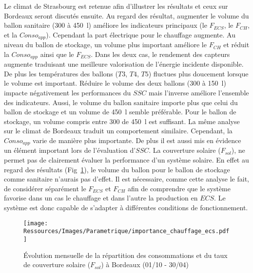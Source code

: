 Le climat de Strasbourg est retenue afin d’illustrer les résultats et ceux sur Bordeaux
seront discutés ensuite. Au regard des résultat, augmenter le volume du ballon sanitaire
(\num{300} à \SI{450}{\litre}) améliore les indicateurs principaux (le $F_{ECS}$, le
$F_{CH}$, et la $Conso_{app}$). Cependant la part électrique pour le chauffage
augmente. Au niveau du ballon de stockage, un volume plus important améliore le $F_{CH}$
et réduit la $Conso_{app}$ ainsi que le $F_{ECS}$. Dans les deux cas, le rendement des
capteurs augmente traduisant une meilleure valorisation de l’énergie incidente disponible.
De plus les températures des ballons ($T3$, $T4$, $T5$) fluctues plus doucement lorsque le
volume est important. Réduire le volume des deux ballons (\num{300} à \SI{150}{\litre})
impacte négativement les performances du $SSC$ mais l’inverse améliore l’ensemble des
indicateurs. Aussi, le volume du ballon sanitaire importe plus que celui du ballon de
stockage et un volume de \SI{450}{\litre} semble préférable. Pour le ballon de stockage,
un volume compris entre \num{300} de \SI{450}{\litre} est suffisant. La même analyse sur
le climat de Bordeaux traduit un comportement similaire. Cependant, la $Conso_{app}$
varie de manière plus importante. De plus il est aussi mis en
évidence un élément important lors de l’évaluation d’$SSC$. La couverture solaire
($F_{sol}$), ne permet pas de clairement évaluer la performance d’un système solaire. En
effet au regard des résultats (Fig~\ref{fig:importance_chauffage_ecs}), le volume du
ballon pour le ballon de stockage comme sanitaire n’aurais pas d’effet. Il est nécessaire,
comme cette analyse le fait, de considérer séparément le $F_{ECS}$ et $F_{CH}$ afin de
comprendre que le système favorise dans un cas le chauffage et dans l’autre la production
en $ECS$. Le système est donc capable de s’adapter à différentes conditions de
fonctionnement.

\begin{figure}
    \begin{center}
        \texttt{[image: Ressources/Images/Parametrique/importance\_chauffage\_ecs.pdf]}
    \end{center}
    \caption{Évolution mensuelle de la répartition des consommations et du taux
             de couverture solaire ($F_{sol}$) à Bordeaux (01/10 - 30/04)
             \label{fig:importance_chauffage_ecs}}
\end{figure}

